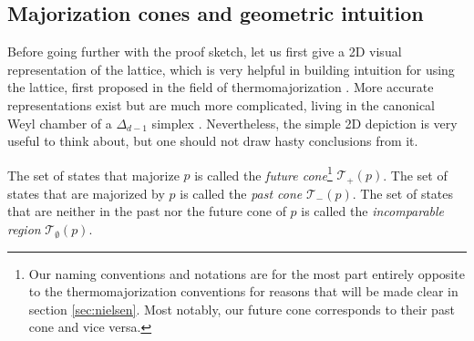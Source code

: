\subsection{Majorization cones and geometric intuition} \label{sec:majorization_cones}

Before going further with the proof sketch, let us first give a 2D visual representation of the lattice, which is very helpful in building intuition for using the lattice, first proposed in the field of thermomajorization \cite{korzekwa_structure_2017}. More accurate representations exist but are much more complicated, living in the canonical Weyl chamber of a $\Delta_{d-1}$ simplex \cite{junior_geometric_2022}. Nevertheless, the simple 2D depiction is very useful to think about, but one should not draw hasty conclusions from it.

\begin{definition} \label{def:majorization_cones}
    The set of states that majorize $p$ is called the \textit{future cone}\footnote{Our naming conventions and notations are for the most part entirely opposite to the thermomajorization conventions for reasons that will be made clear in section \ref{sec:nielsen}. Most notably, our future cone corresponds to their past cone and vice versa.}  $\mathcal{T}_+ (p)$. The set of states that are majorized by $p$ is called the \textit{past cone} $\mathcal{T}_- (p)$. The set of states that are neither in the past nor the future cone of $p$ is called the \textit{incomparable region} $\mathcal{T}_\emptyset (p)$.
\end{definition}

